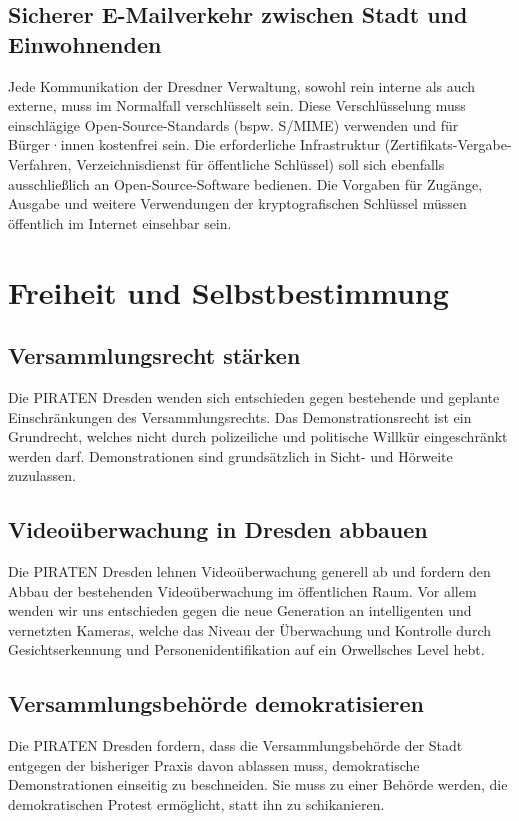 \documentclass[a4paper, 11pt]{article}
\begin{document}
\subsection{Sicherer E-Mailverkehr zwischen Stadt und Einwohnenden}
Jede Kommunikation der Dresdner Verwaltung, sowohl rein interne als auch externe, muss im Normalfall verschlüsselt sein. Diese Verschlüsselung muss einschlägige Open-Source-Standards (bspw. S/MIME) verwenden und für Bürger·innen kostenfrei sein. Die erforderliche Infrastruktur (Zertifikats-Vergabe-Verfahren, Verzeichnisdienst für öffentliche Schlüssel) soll sich ebenfalls ausschließlich an Open-Source-Software bedienen. Die Vorgaben für Zugänge, Ausgabe und weitere Verwendungen der kryptografischen Schlüssel müssen öffentlich im Internet einsehbar sein.


\section{Freiheit und Selbstbestimmung}

\subsection{Versammlungsrecht stärken}
Die PIRATEN Dresden wenden sich entschieden gegen bestehende und geplante Einschränkungen des Versammlungsrechts. Das Demonstrationsrecht ist ein Grundrecht, welches nicht durch polizeiliche und politische Willkür eingeschränkt werden darf. Demonstrationen sind grundsätzlich in Sicht- und Hörweite zuzulassen.


\subsection{Videoüberwachung in Dresden abbauen}
Die PIRATEN Dresden lehnen Videoüberwachung generell ab und fordern den Abbau der bestehenden Videoüberwachung im öffentlichen Raum. Vor allem wenden wir uns entschieden gegen die neue Generation an intelligenten und vernetzten Kameras, welche das Niveau der Überwachung und Kontrolle durch Gesichtserkennung und Personenidentifikation auf ein Orwellsches Level hebt.




\subsection{Versammlungsbehörde demokratisieren}
Die PIRATEN Dresden fordern, dass die Versammlungsbehörde der Stadt entgegen der bisheriger Praxis davon ablassen muss, demokratische Demonstrationen einseitig zu beschneiden. Sie muss zu einer Behörde werden, die demokratischen Protest ermöglicht, statt ihn zu schikanieren.
\end{document}

